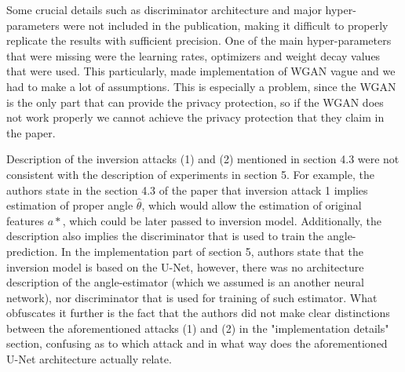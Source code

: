 Some crucial details such as discriminator architecture and major hyper-parameters were not included in the publication, making it difficult to properly replicate the results with sufficient precision. One of the main hyper-parameters that were missing were the learning rates, optimizers and weight decay values that were used. This particularly, made implementation of WGAN vague and we had to make a lot of assumptions. This is especially a problem, since the WGAN is the only part that can provide the privacy protection, so if the WGAN does not work properly we cannot achieve the privacy protection that they claim in the paper.

Description of the inversion attacks (1) and (2) mentioned in section 4.3 were not consistent with the description of experiments in section 5. For example, the authors state in the section 4.3 of the paper that inversion attack 1 implies  estimation of proper angle $\hat{\theta}$, which would allow the estimation of original features $a*$, which could be later passed to inversion model. Additionally, the description also implies the discriminator that is used to train the angle-prediction. In the implementation part of section 5, authors state that the inversion model is based on the U-Net, however, there was no architecture description of the angle-estimator (which we assumed is an another neural network), nor discriminator that is used for training of such estimator. What obfuscates it further is the fact that the authors did not make clear distinctions between the aforementioned attacks (1) and (2) in the "implementation details" section, confusing as to which attack and in what way does the aforementioned U-Net architecture actually relate.




% 
% 